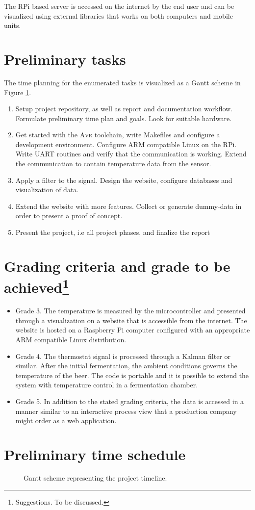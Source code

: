\documentclass[10pt]{article}
\newcommand{\AVR}{\textsc{Avr}\xspace}
\begin{document}
The RPi based server is accessed on the internet by the end user and can be visualized using external libraries that works on both computers and mobile units.
\newpage
\section*{Preliminary tasks}%
\label{sec:preliminary_tasks}
The time planning for the enumerated tasks is visualized as a Gantt scheme in Figure \ref{fig:gantt}.
\begin{enumerate}
  \item
Setup project repository, as well as report and documentation workflow. Formulate preliminary time plan and goals. Look for suitable hardware.
  \item
Get started with the \AVR toolchain, write Makefiles and configure a development environment. Configure ARM compatible Linux on the RPi. Write UART routines and verify that the communication is working. Extend the communication to contain temperature data from the sensor.
  \item
    Apply a filter to the signal. Design the website, configure databases and visualization of data.
  \item
    Extend the website with more features. Collect or generate dummy-data in order to present a proof of concept.
  \item Present the project, i.e all project phases, and finalize the report
\end{enumerate}
\section*{Grading criteria and grade to be achieved\protect\footnote{Suggestions. To be discussed.}}%
\label{sec:grading_criteria_and_grading_goal}
\begin{itemize}
  \item 
    Grade 3. The temperature is measured by the microcontroller and presented through a visualization on a website that is accessible from the internet. The website is hosted on a Raspberry Pi computer configured with an appropriate ARM compatible Linux distribution.
  \item 
   Grade 4. The thermostat signal is processed through a Kalman filter or similar. After the initial fermentation, the ambient conditions governs the temperature of the beer. The code is portable and it is possible to extend the system with temperature control in a fermentation chamber.
  \item
   Grade 5. In addition to the stated grading criteria, the data is accessed in a manner similar to an interactive process view that a production company might order as a web application.
\end{itemize}

\newpage
\section*{Preliminary time schedule}%
\label{sec:preliminary_time_schedule}


\begin{figure}[ht]
  \centering
  
  \caption{Gantt scheme representing the project timeline.}
  \label{fig:gantt}
\end{figure}
\end{document}
